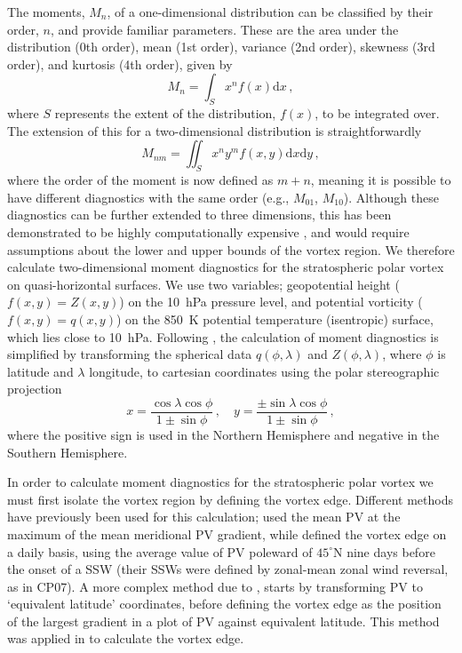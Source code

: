 The moments, $M_{n}$, of a one-dimensional distribution can be classified by
their order, $n$, and provide familiar parameters. These are the area under the
distribution (0th order), mean (1st order), variance (2nd order), skewness (3rd
order), and kurtosis (4th order), given by
\begin{equation}
M_{n} = \int_{S} x^{n}f(x)\mathrm{d}x \, ,
\end{equation}
where $S$ represents the extent of the distribution, $f(x)$, to be integrated
over. The extension of this for a two-dimensional distribution is
straightforwardly
\begin{equation}
M_{nm} = \iint_{S} x^{n}y^{m}f(x,y)\mathrm{d}x\mathrm{d}y \, ,
\label{eq:2D_moment}
\end{equation}
where the order of the moment is now defined as $m+n$, meaning it is possible to
have different diagnostics with the same order (e.g., $M_{01}$,
$M_{10}$). Although these diagnostics can be further extended to three
dimensions, this has been demonstrated to be highly computationally expensive
\citep{Li1994}, and would require assumptions about the lower and upper bounds
of the vortex region. We therefore calculate two-dimensional moment diagnostics
for the stratospheric polar vortex on quasi-horizontal surfaces. We use two
variables; geopotential height ($f(x,y) = Z(x,y)$) on the 10~hPa pressure level,
and potential vorticity ($f(x,y) = q(x,y)$) on the 850~K potential temperature
(isentropic) surface, which lies close to 10~hPa. Following \citet{Waugh1997},
the calculation of moment diagnostics is simplified by transforming the
spherical data $q(\phi,\lambda)$ and $Z(\phi,\lambda)$, where $\phi$ is latitude
and $\lambda$ longitude, to cartesian coordinates using the polar stereographic
projection
\begin{equation}
x = \frac{\cos\lambda\cos\phi}{1 \pm \sin\phi}\, , \quad
y = \frac{\pm\sin\lambda\cos\phi}{1 \pm \sin\phi}\, , 
\end{equation}  
where the positive sign is used in the Northern Hemisphere and negative in the
Southern Hemisphere.

In order to calculate moment diagnostics for the stratospheric polar vortex we
must first isolate the vortex region by defining the vortex edge. Different
methods have previously been used for this calculation; \citet{Waugh1999} used
the mean PV at the maximum of the mean meridional PV gradient, while
\citet{Matthewman2009} defined the vortex edge on a daily basis, using the
average value of PV poleward of $45^{\circ}$N nine days before the onset of a
SSW (their SSWs were defined by zonal-mean zonal wind reversal, as in CP07). A
more complex method due to \citet{Nash1996}, starts by transforming PV to
`equivalent latitude' \citep{Butchart1986} coordinates, before defining the
vortex edge as the position of the largest gradient in a plot of PV against
equivalent latitude. This method was applied in \citet{Mitchell2011} to
calculate the vortex edge. 


